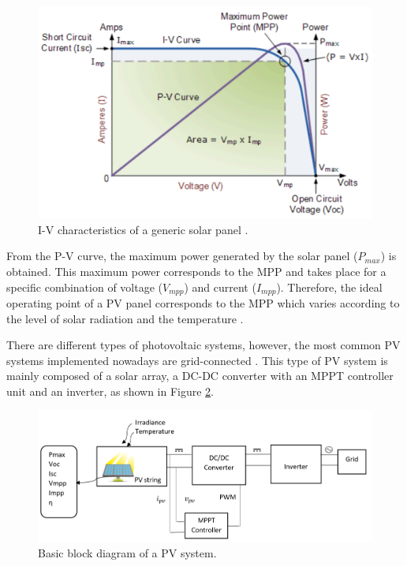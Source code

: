 \begin{figure}[htbp]
	\begin{center}
		\includegraphics[width=0.88\linewidth]{../Pictures/IVcurve}
		\caption{I-V characteristics of a generic solar panel \cite{IVcurves}.}
		\label{fig:mpp}
	\end{center}
\end{figure}

From the P-V curve, the maximum power generated by the solar panel ($P_{max}$) is obtained. This maximum power corresponds to the MPP and takes place for a specific combination of voltage ($V_{mpp}$) and current ($I_{mpp}$). Therefore, the ideal operating point of a PV panel corresponds to the MPP which varies according to the level of solar radiation and the temperature \cite{handbook}. 

There are different types of photovoltaic systems, however, the most common PV systems implemented nowadays are grid-connected \cite{handbook}. This type of PV system is mainly composed of a solar array, a DC-DC converter with an MPPT controller unit and an inverter, as shown in Figure \ref{fig:PVsystemblocks}. 

\begin{figure}[htbp]
	\includegraphics[width=\linewidth]{../Pictures/PV_system_blocks}
	\caption{Basic block diagram of a PV system.}
	\label{fig:PVsystemblocks}
\end{figure}

